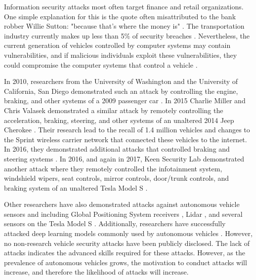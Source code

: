 \documentclass{article}
\begin{document}
Information security attacks most often target finance and retail organizations. One simple explanation for this is the quote often misattributed to the bank robber Willie Sutton: "because that's where the money is" \citep{sutton_where_2004}. The transportation industry currently makes up less than 5\% of security breaches \citep{verizon_2017_2017, trustwave_2017_2017}. Nevertheless, the current generation of vehicles controlled by computer systems may contain vulnerabilities, and if malicious individuals exploit these vulnerabilities, they could compromise the computer systems that control a vehicle \citep{koscher_experimental_2010}.

In 2010, researchers from the University of Washington and the University of California, San Diego demonstrated such an attack by controlling the engine, braking, and other systems of a 2009 passenger car \citep{koscher_experimental_2010}.  In 2015 Charlie Miller and Chris Valasek demonstrated a similar attack by remotely controlling the acceleration, braking, steering, and other systems of an unaltered 2014 Jeep Cherokee \citep{miller_remote_2015}. Their research lead to the recall of 1.4 million vehicles and changes to the Sprint wireless carrier network that connected these vehicles to the internet. In 2016, they demonstrated additional attacks that controlled braking and steering systems \citep{miller_advanced_2016}. In 2016, and again in 2017, Keen Security Lab demonstrated another attack where they remotely controlled the infotainment system, windshield wipers, seat controls, mirror controls, door/trunk controls, and braking system of an unaltered Tesla Model S \citep{keen_security_lab_of_tencent_car_2016, keen_security_lab_of_tencent_new_2017}.

Other researchers have also demonstrated attacks against autonomous vehicle sensors and including Global Positioning System receivers \citep{lin_gps_2015}, Lidar \citep{10.1007/978-3-319-66787-4_22}, and several sensors on the Tesla Model S \citep{yan_can_2016}. Additionally, researchers have successfully attacked deep learning models commonly used by autonomous vehicles \citep{evtimov_robust_2017, goodfellow_attacking_2017}. However, no non-research vehicle security attacks have been publicly disclosed. The lack of attacks indicates the advanced skills required for these attacks. However, as the prevalence of autonomous vehicles grows, the motivation to conduct attacks will increase, and therefore the likelihood of attacks will increase.

\end{document}

